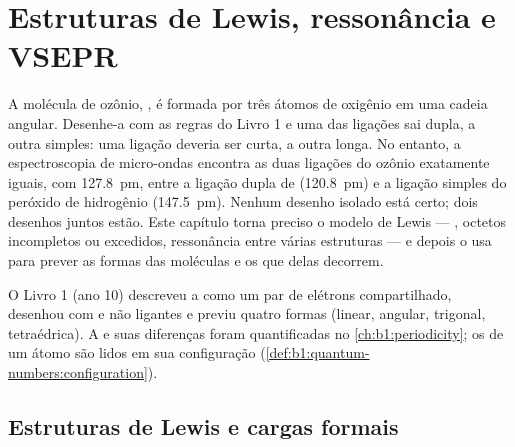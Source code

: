 \chapter{Estruturas de Lewis, ressonância e VSEPR}\label{ch:b1:lewis-resonance-vsepr}

A molécula de ozônio, , é formada por três átomos de oxigênio em
uma cadeia angular. Desenhe-a com as regras do Livro 1 e uma das
ligações sai dupla, a outra simples: uma ligação deveria ser curta, a
outra longa. No entanto, a espectroscopia de micro-ondas encontra as
duas ligações  do ozônio exatamente iguais, com
\qty{127.8}{pm}, entre a ligação dupla de  (\qty{120.8}{pm}) e a
ligação simples do peróxido de hidrogênio (\qty{147.5}{pm}). Nenhum
desenho isolado está certo; dois desenhos juntos estão. Este capítulo
torna preciso o modelo de Lewis --- , octetos incompletos
ou excedidos, ressonância entre várias estruturas --- e depois o usa para
prever as formas das moléculas e os  que delas decorrem.

\begin{recall}
O Livro 1 (ano 10) descreveu a  como um par de elétrons
compartilhado, desenhou  com  e não
ligantes e previu quatro formas (linear, angular, trigonal, tetraédrica).
A  e suas diferenças foram quantificadas no
\cref{ch:b1:periodicity}; os  de um átomo são lidos
em sua configuração (\cref{def:b1:quantum-numbers:configuration}).
\end{recall}

\section{Estruturas de Lewis e cargas formais}

